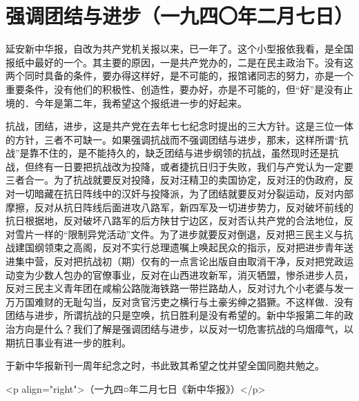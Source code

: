 \section[强调团结与进步（一九四〇年二月七日）]{强调团结与进步（一九四〇年二月七日）}


延安新中华报，自改为共产党机关报以来，已一年了。这个小型报依我看，是全国报纸中最好的一个。其主要的原因，一是共产党办的，二是在民主政治下。没有这两个同时具备的条件，要办得这样好，是不可能的，报馆诸同志的努力，亦是一个重要条件，没有他们的积极性、创造性，要办好，亦是不可能的，但“好”是没有止境的．今年是第二年，我希望这个报纸进一步的好起来。

抗战，团结，进步，这是共产党在去年七七纪念时提出的三大方针。这是三位一体的方针，三者不可缺一。如果强调抗战而不强调团结与进步，那末，这样所谓“抗战”是靠不住的，是不能持久的，缺乏团结与进步纲领的抗战，虽然现时还是抗战，但终有一日要把抗战改为投降，或者捷抗日归于失败，我们与产党认为一定要三者合一。为了抗战就要反对投降，反对汪精卫的卖国协定，反对汪的伪政府，反对一切暗藏在抗日阵线中的汉奸与投降派，为了团结就要反对分裂运动，反对内部摩擦，反对从抗日阵线后面进攻八路军，新四军及一切进步势力，反对破坏前线的抗日根据地，反对破坏八路军的后方陕甘宁边区，反对否认共产党的合法地位，反对雪片一样的“限制异党活动”文件。为了进步就要反对倒退，反对把三民主义与抗战建国纲领束之高阁，反对不实行总理遗嘱上唤起民众的指示，反对把进步青年送进集中营，反对把抗战初（期）仅有的一点言论出版自由取消干净，反对把党政运动变为少数人包办的官僚事业，反对在山西进攻新军，消灭牺盟，惨杀进步人员，反对三民主义青年团在咸榆公路陇海铁路一带拦路劫人，反对讨九个小老婆与发一万万国难财的无耻勾当，反对贪官污吏之横行与土豪劣绅之猖獗。不这样做．没有团结与进步，所谓抗战的只是空唤，抗日胜利是没有希望的。新中华报第二年的政治方向是什么？我们了解是强调团结与进步，以反对一切危害抗战的乌烟瘴气，以期抗日事业有进一步的胜利。

于新中华报新刊一周年纪念之时，书此致其希望之忱并望全国同胞共勉之。


<p align="right">（一九四○年二月七日《新中华报》）</p>

